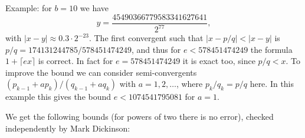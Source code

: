 \documentclass[12pt]{amsart}
\begin{document}
Example: for $b=10$ we have
\[ y = \frac{45490366779583341627641}{2^{77}}, \]
with $|x-y| \approx 0.3 \cdot 2^{-23}$.
The first convergent such that $|x-p/q| < |x-y|$ is
$p/q=174131244785/578451474249$, and thus for $e<578451474249$ the formula
$1 + \lceil e x \rceil$ is correct.
In fact for $e=578451474249$ it is exact too, since $p/q < x$.
To improve the bound we can consider semi-convergents $(p_{k-1} + a p_k)/
(q_{k-1} + a q_k)$ with $a=1, 2, \ldots$, where $p_k/q_k = p/q$ here.
In this example this gives the bound $e < 1074541795081$ for $a=1$.

We get the following bounds (for powers of two there is no error), checked
independently by Mark Dickinson:
\end{document}

